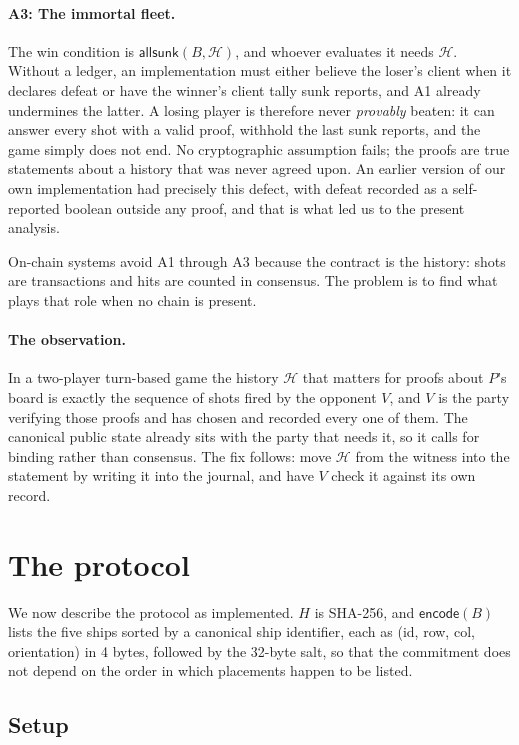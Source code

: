 \documentclass[11pt,a4paper]{article}
\begin{document}
\paragraph{A3: The immortal fleet.} The win condition is
$\mathsf{allsunk}(B, \mathcal{H})$, and whoever evaluates it needs
$\mathcal{H}$. Without a ledger, an implementation must either believe the
loser's client when it declares defeat or have the winner's client tally sunk
reports, and A1 already undermines the latter. A losing player is therefore
never \emph{provably} beaten: it can answer every shot with a valid proof,
withhold the last sunk reports, and the game simply does not end. No
cryptographic assumption fails; the proofs are true statements about a history
that was never agreed upon. An earlier version of our own implementation had
precisely this defect, with defeat recorded as a self-reported boolean outside
any proof, and that is what led us to the present analysis.

On-chain systems avoid A1 through A3 because the contract is the history: shots
are transactions and hits are counted in consensus. The problem is to find what
plays that role when no chain is present.

\paragraph{The observation.} In a two-player turn-based game the history
$\mathcal{H}$ that matters for proofs about $P$'s board is exactly the sequence
of shots fired by the opponent $V$, and $V$ is the party verifying those proofs
and has chosen and recorded every one of them. The canonical public state
already sits with the party that needs it, so it calls for binding rather than
consensus. The fix follows: move $\mathcal{H}$ from the witness into the
statement by writing it into the journal, and have $V$ check it against its own
record.

\section{The protocol}
\label{sec:protocol}

We now describe the protocol as implemented. $H$ is SHA-256, and
$\mathsf{encode}(B)$ lists the five ships sorted by a canonical ship
identifier, each as (id, row, col, orientation) in 4 bytes, followed by the
32-byte salt, so that the commitment does not depend on the order in which
placements happen to be listed.

\subsection{Setup}
\end{document}
